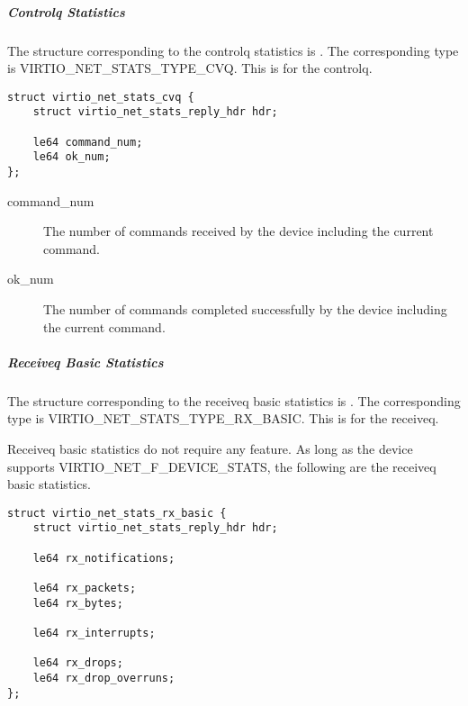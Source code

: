 \subparagraph{Controlq Statistics}\label{sec:Device Types / Network Device / Device Operation / Control Virtqueue / Device Statistics / Controlq Statistics}

The structure corresponding to the controlq statistics is
. The corresponding type is
VIRTIO_NET_STATS_TYPE_CVQ. This is for the controlq.

\begin{lstlisting}
struct virtio_net_stats_cvq {
    struct virtio_net_stats_reply_hdr hdr;

    le64 command_num;
    le64 ok_num;
};
\end{lstlisting}

\begin{description}
    \item [command_num]
        The number of commands received by the device including the current command.

    \item [ok_num]
        The number of commands completed successfully by the device including the current command.
\end{description}


\subparagraph{Receiveq Basic Statistics}\label{sec:Device Types / Network Device / Device Operation / Control Virtqueue / Device Statistics / Receiveq Basic Statistics}

The structure corresponding to the receiveq basic statistics is
. The corresponding type is
VIRTIO_NET_STATS_TYPE_RX_BASIC. This is for the receiveq.

Receiveq basic statistics do not require any feature. As long as the device supports
VIRTIO_NET_F_DEVICE_STATS, the following are the receiveq basic statistics.

\begin{lstlisting}
struct virtio_net_stats_rx_basic {
    struct virtio_net_stats_reply_hdr hdr;

    le64 rx_notifications;

    le64 rx_packets;
    le64 rx_bytes;

    le64 rx_interrupts;

    le64 rx_drops;
    le64 rx_drop_overruns;
};
\end{lstlisting}

